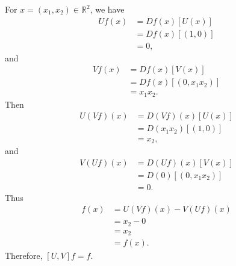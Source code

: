 \documentclass[en, oneside]{assignment}
\begin{document}
\begin{sol}
    For $x = (x_1, x_2) \in \mathbb{R} ^2$, we have
    \begin{align*}
        U f (x) &= D f (x) [U(x)]\\
        &= D f (x) [(1, 0)]\\
        &= 0,
    \end{align*}
    and
    \begin{align*}
        V f (x) &= D f (x) [V(x)]\\
        &= D f (x) [(0, x_1 x_2)]\\
        &= x_1 x_2.
    \end{align*}
    Then
    \begin{align*}
        U (V f) (x) &= D (V f) (x) [U(x)]\\
        &= D (x_1 x_2) [(1, 0)]\\
        &= x_2,
    \end{align*}
    and
    \begin{align*}
        V (U f) (x) &= D (U f) (x) [V(x)]\\
        &= D (0) [(0, x_1 x_2)]\\
        &= 0.
    \end{align*}
    Thus
    \begin{align*}
        [U, V] f (x) &= U (V f) (x) - V (U f) (x)\\
        &= x_2 - 0\\
        &= x_2\\
        &= f(x).
    \end{align*}
    Therefore, $[U, V] f = f$.
\end{sol}
\end{document}
